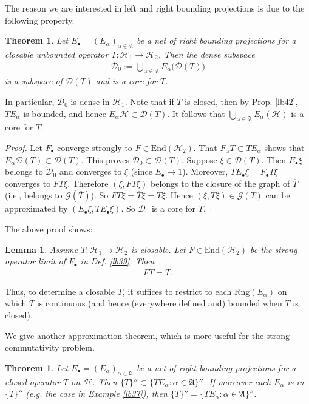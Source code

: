 \documentclass[12pt,b5paper,notitlepage]{article}
\theoremstyle{definition}
\theoremstyle{plain}
\newtheorem{thm}[df]{Theorem}
\newtheorem{lm}[df]{Lemma}
\newcommand{\fk}{\mathfrak}
\newcommand{\mc}{\mathcal}
\newcommand{\ovl}{\overline}
\newcommand{\End}{\mathrm{End}} %
\newcommand{\Dom}{\scr D}
\newcommand{\scr}{\mathscr}
\newcommand{\blt}{\bullet}
\newcommand{\Rng}{\mathrm{Rng}}
\numberwithin{equation}{section}
\begin{document}
The reason we are interested in left and right bounding projections is due to the following property.

\begin{thm}\label{lb44}
Let $E_\blt=(E_\alpha)_{\alpha\in\fk A}$ be a net of right bounding projections for a closable unbounded operator $T:\mc H_1\rightarrow\mc H_2$. Then the dense subspace
\begin{align*}
\Dom_0:=\bigcup_{\alpha\in\fk A}E_\alpha\big(\Dom(T)\big)
\end{align*}
is a subspace of $\Dom(T)$ and is a core for $T$. 
\end{thm}

In particular, $\Dom_0$ is dense in $\mc H_1$. Note that if $T$ is closed, then by Prop. \ref{lb42}, $TE_\alpha$ is bounded, and hence $E_\alpha\mc H\subset\Dom(T)$. It follows that $\bigcup_{\alpha\in\fk A}E_\alpha(\mc H)$ is a core for $T$.


\begin{proof}
Let $F_\blt$ converge strongly to $F\in\End(\mc H_2)$. That $F_\alpha T\subset TE_\alpha$ shows that $E_\alpha\Dom(T)\subset\Dom(T)$. This proves $\Dom_0\subset\Dom(T)$. Suppose $\xi\in\Dom(T)$. Then $E_\blt\xi$ belongs to $\Dom_0$ and converges to $\xi$ (since $E_\blt\rightarrow 1$). Moreover, $TE_\blt\xi=F_\blt T\xi$ converges  to $FT\xi$. Therefore $(\xi,FT\xi)$ belongs to the closure of the graph of $\ovl T$ (i.e., belongs to $\scr G(\ovl T)$). So $FT\xi=\ovl T\xi=T\xi$. Hence $(\xi,T\xi)\in\scr G(T)$ can be approximated by $(E_\blt\xi,TE_\blt\xi)$. So $\Dom_0$ is a core for $T$.
\end{proof}

The above proof shows:

\begin{lm}\label{lb40}
Assume $T:\mc H_1\rightarrow\mc H_2$ is closable. Let $F\in\End(\mc H_2)$ be the strong operator limit of $F_\blt$ in Def. \ref{lb39}. Then
\begin{align}
FT=T.	
\end{align}
\end{lm}


Thus, to determine a closable $T$, it suffices to restrict to each $\Rng(E_\alpha)$ on which $T$ is continuous (and hence (everywhere defined and) bounded when $T$ is closed).


We give another approximation theorem, which is more useful for the strong commutativity problem.

\begin{thm}\label{lb41}
Let $E_\blt=(E_\alpha)_{\alpha\in\fk A}$ be a net of right bounding projections for a closed operator $T$ on $\mc H$. Then $\{T\}''\subset \{TE_\alpha:\alpha\in\fk A\}''$. If moreover each $E_\alpha$ is in $\{T\}''$ (e.g. the case in Example \ref{lb37}), then $\{T\}''=\{TE_\alpha:\alpha\in\fk A\}''$.
\end{thm}
\end{document}
